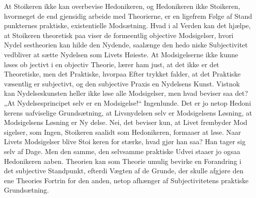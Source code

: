 \documentclass[12pt]{book}
\newcommand{\opage}[1]{\marginnote{\footnotesize\textit{[#1]}}}
\begin{document}
At Stoikeren ikke kan overbevise Hedonikeren, og
Hedonikeren ikke Stoikeren, hvormeget de end gjensidig
arbeide med Theorierne, er en ligefrem Følge af Stand\-%
punkternes praktiske, existentielle Modsætning. Hvad i
al Verden kan det hjælpe, at Stoikeren theoretisk paa\-%
viser de formeentlig objective Modsigelser, hvori Nydel\-%
sestheorien kan hilde den Nydende, saalænge den hedo\-%
niske Subjectivitet vedbliver at sætte Nydelsen som
Livets Høieste. At Modsigelserne ikke kunne løses ob\-%
jectivt i en objectiv Theorie, lærer ham just, at det ikke
er det Theoretiske, men det Praktiske, hvorpaa Efter\-%
\opage{15}\setcounter{footnote}{0}%
trykket falder, at det Praktiske væsentlig er subjectivt,
og den subjective Praxis en Nydelsens Kunst. Vistnok
kan Nydelseskunsten heller ikke løse alle Modsigelser,
men hvad beviser saa det? „At Nydelsesprincipet selv er
en Modsigelse!“ Ingenlunde. Det er jo netop Hedoni\-%
kerens uafviselige Grundsætning, at Livsnydelsen selv er
Modsigelsens Løsning, at Modsigelsens Løsning er Ny\-%
delse. Nei, det beviser kun, at Livet frembyder Mod\-%
sigelser, som Ingen, Stoikeren saalidt som Hedonikeren,
formaaer at løse. Naar Livets Modsigelser blive Stoi\-%
keren for stærke, hvad gjør han saa? Han tager sig selv
af Dage. Men den samme, den selvsamme praktiske
Udvei staaer jo ogsaa Hedonikeren aaben. Theorien
kan som Theorie umulig bevirke en Forandring i det
subjective Standpunkt, efterdi Vægten af de Grunde, der
skulle afgjøre den ene Theories Fortrin for den anden,
netop afhænger af Subjectivitetens praktiske Grundsætning.
\end{document}
